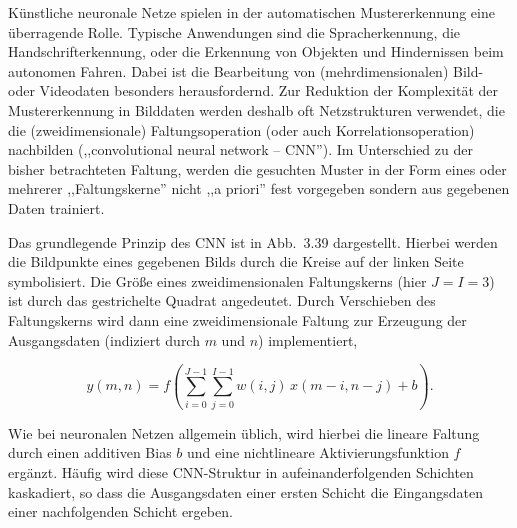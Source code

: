 \begin{beispiel}
Künstliche neuronale Netze spielen in der automatischen Mustererkennung eine überragende Rolle. Typische Anwendungen sind die Spracherkennung, die Handschrifterkennung, oder die Erkennung von Objekten und Hindernissen beim autonomen Fahren. Dabei ist die Bearbeitung von (mehrdimensionalen) Bild- oder Videodaten besonders herausfordernd. Zur Reduktion der Komplexität der Mustererkennung in Bilddaten werden deshalb oft Netzstrukturen verwendet, die die (zweidimensionale) Faltungsoperation (oder auch Korrelationsoperation) nachbilden (,,convolutional neural network -- CNN''). Im Unterschied zu der bisher betrachteten Faltung, werden die gesuchten Muster in der Form eines oder mehrerer ,,Faltungskerne'' nicht ,,a priori'' fest vorgegeben sondern aus gegebenen Daten trainiert.

Das grundlegende Prinzip des CNN ist in Abb.\ 3.39 dargestellt. Hierbei werden die Bildpunkte eines gegebenen Bilds durch die Kreise auf der linken Seite symbolisiert. Die Größe eines zweidimensionalen Faltungskerns (hier $J = I = 3$) ist durch das gestrichelte Quadrat angedeutet. Durch Verschieben des Faltungskerns wird dann eine zweidimensionale Faltung zur Erzeugung der Ausgangsdaten (indiziert durch $m$ und $n$) implementiert,

$$
y(m,n) = f\!\left(\sum_{i=0}^{J-1}\sum_{j=0}^{I-1} w(i,j)\,x(m-i, n-j) + b\right).
$$


Wie bei neuronalen Netzen allgemein üblich, wird hierbei die lineare Faltung durch einen additiven Bias $b$ und eine nichtlineare Aktivierungsfunktion $f$ ergänzt. Häufig wird diese CNN-Struktur in aufeinanderfolgenden Schichten kaskadiert, so dass die Ausgangsdaten einer ersten Schicht die Eingangsdaten einer nachfolgenden Schicht ergeben.
\end{beispiel}

